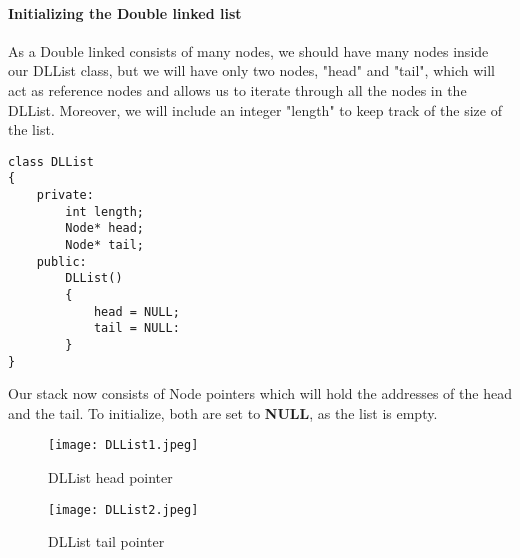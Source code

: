 \documentclass[11pt,fleqn]{book} %
\begin{document}
\paragraph{Initializing the Double linked list}
As a Double linked consists of many nodes, we should have many nodes inside our DLList class, but we will have only two nodes, "head" and "tail", which will act as reference nodes and allows us to iterate through all the nodes in the DLList. Moreover, we will include an integer "length" to keep track of the size of the list.
\begin{lstlisting}
class DLList
{
	private:
		int length;
		Node* head;
		Node* tail;
	public:
		DLList()
		{
			head = NULL;
			tail = NULL:
		}
}
\end{lstlisting}
Our stack now consists of Node pointers which will hold the addresses of the head and the tail. To initialize, both are set to \textbf{NULL}, as the list is empty.
\begin{figure}[H]
	\centering
	\texttt{[image: DLList1.jpeg]}
	\caption{DLList head pointer}
\end{figure}
\begin{figure}[H]
	\centering
	\texttt{[image: DLList2.jpeg]}
	\caption{DLList tail pointer}
\end{figure}
\end{document}
